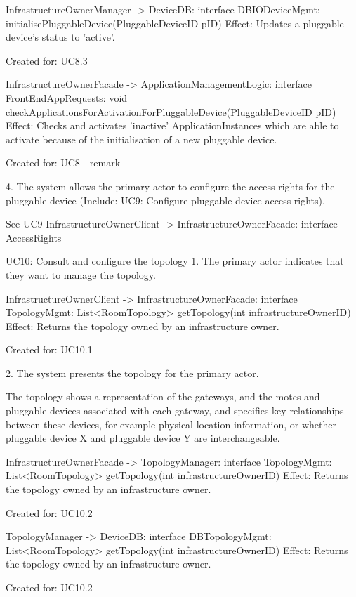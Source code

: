 {{{            InfrastructureOwnerManager -> DeviceDB: interface DBIODeviceMgmt: initialisePluggableDevice(PluggableDeviceID pID)
                Effect: Updates a pluggable device's status to 'active'.
                \item Created for: UC8.3

            InfrastructureOwnerFacade -> ApplicationManagementLogic: interface FrontEndAppRequests: void checkApplicationsForActivationForPluggableDevice(PluggableDeviceID pID)
                Effect: Checks and activates 'inactive' ApplicationInstances which are able to activate because of the initialisation of a new pluggable device.
                \item Created for: UC8 - remark

        4. The system allows the primary actor to configure the access rights for the pluggable device (Include: UC9: Configure pluggable device access rights).

            See UC9
            InfrastructureOwnerClient -> InfrastructureOwnerFacade: interface AccessRights


    UC10: Consult and configure the topology
        1. The primary actor indicates that they want to manage the topology.

            InfrastructureOwnerClient -> InfrastructureOwnerFacade: interface TopologyMgmt: List<RoomTopology> getTopology(int infrastructureOwnerID)
                Effect: Returns the topology owned by an infrastructure owner.
                \item Created for: UC10.1

        2. The system presents the topology for the primary actor.
           { The topology shows a representation of the gateways, and the motes and pluggable devices associated with each gateway,
           and specifies key relationships between these devices, for example physical location information,
           or whether pluggable device X and pluggable device Y are interchangeable.

            InfrastructureOwnerFacade -> TopologyManager: interface TopologyMgmt: List<RoomTopology> getTopology(int infrastructureOwnerID)
               Effect: Returns the topology owned by an infrastructure owner.
               \item Created for: UC10.2

            TopologyManager -> DeviceDB: interface DBTopologyMgmt: List<RoomTopology> getTopology(int infrastructureOwnerID)
               Effect: Returns the topology owned by an infrastructure owner.
               \item Created for: UC10.2

}}}}
